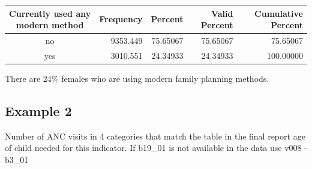 \documentclass[
  letterpaper,
  DIV=11,
  numbers=noendperiod]{scrartcl}
\begin{document}
\begin{longtable*}{crrrr}
\toprule
Currently used any modern method & Frequency & Percent & Valid Percent & Cumulative Percent \\ 
\midrule
no & 9353.449 & 75.65067 & 75.65067 & 75.65067 \\ 
yes & 3010.551 & 24.34933 & 24.34933 & 100.00000 \\ 
\bottomrule
\end{longtable*}

There are 24\% females who are using modern family planning methods.

\hypertarget{example-2}{%
\subsection{Example 2}\label{example-2}}

Number of ANC visits in 4 categories that match the table in the final
report age of child needed for this indicator. If b19\_01 is not
available in the data use v008 - b3\_01
\end{document}
